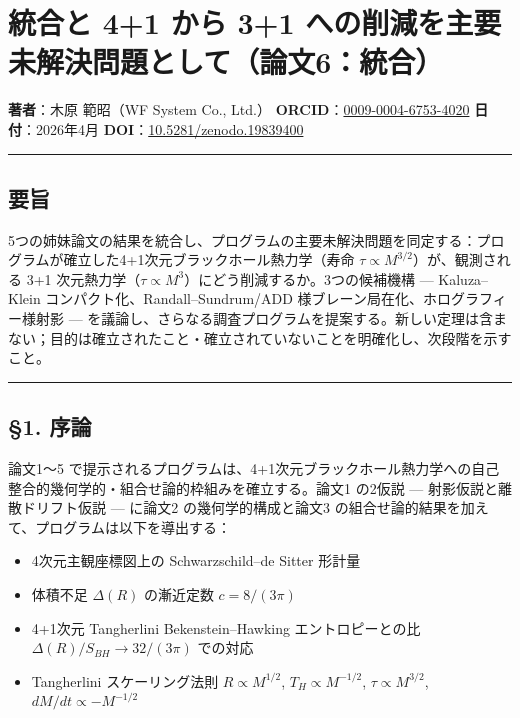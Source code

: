 \documentclass[a4paper,11pt]{ltjsarticle}
\theoremstyle{definition}
\providecommand{\tightlist}{\setlength{\itemsep}{0pt}\setlength{\parskip}{0pt}}
\begin{document}
\section{統合と 4+1 から 3+1
への削減を主要未解決問題として（論文6：統合）}\label{ux7d71ux5408ux3068-41-ux304bux3089-31-ux3078ux306eux524aux6e1bux3092ux4e3bux8981ux672aux89e3ux6c7aux554fux984cux3068ux3057ux3066ux8ad6ux65876ux7d71ux5408}

\textbf{著者}：木原 範昭（WF System Co., Ltd.）
\textbf{ORCID}：\href{https://orcid.org/0009-0004-6753-4020}{0009-0004-6753-4020}
\textbf{日付}：2026年4月
\textbf{DOI}：\href{https://doi.org/10.5281/zenodo.19839400}{10.5281/zenodo.19839400}

\begin{center}\rule{0.5\linewidth}{0.5pt}\end{center}

\subsection{要旨}\label{ux8981ux65e8}

5つの姉妹論文の結果を統合し、プログラムの主要未解決問題を同定する：プログラムが確立した4+1次元ブラックホール熱力学（寿命
\(\tau \propto M^{3/2}\)）が、観測される 3+1
次元熱力学（\(\tau \propto M^3\)）にどう削減するか。3つの候補機構 ---
Kaluza--Klein コンパクト化、Randall--Sundrum/ADD
様ブレーン局在化、ホログラフィー様射影 ---
を議論し、さらなる調査プログラムを提案する。新しい定理は含まない；目的は確立されたこと・確立されていないことを明確化し、次段階を示すこと。

\begin{center}\rule{0.5\linewidth}{0.5pt}\end{center}

\subsection{§1. 序論}\label{ux5e8fux8ad6}

論文1〜5
で提示されるプログラムは、4+1次元ブラックホール熱力学への自己整合的幾何学的・組合せ論的枠組みを確立する。論文1
の2仮説 --- 射影仮説と離散ドリフト仮説 --- に論文2 の幾何学的構成と論文3
の組合せ論的結果を加えて、プログラムは以下を導出する：

\begin{itemize}
\tightlist
\item
  4次元主観座標図上の Schwarzschild--de Sitter 形計量
\item
  体積不足 \(\Delta(R)\) の漸近定数 \(c = 8/(3\pi)\)
\item
  4+1次元 Tangherlini Bekenstein--Hawking エントロピーとの比
  \(\Delta(R)/S_{BH} \to 32/(3\pi)\) での対応
\item
  Tangherlini スケーリング法則 \(R \propto M^{1/2}\),
  \(T_H \propto M^{-1/2}\), \(\tau \propto M^{3/2}\),
  \(dM/dt \propto -M^{-1/2}\)
\end{itemize}
\end{document}
